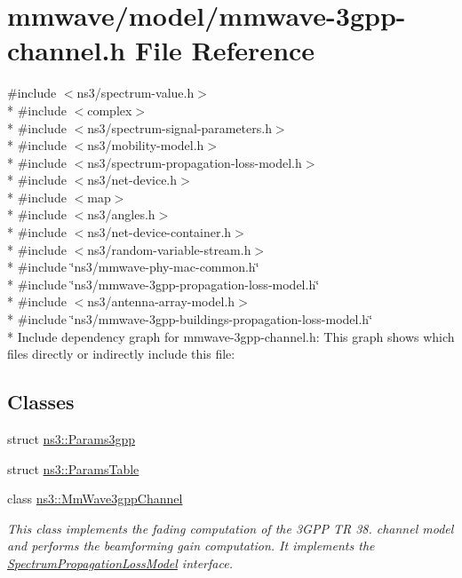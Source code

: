 \hypertarget{mmwave-3gpp-channel_8h}{}\section{mmwave/model/mmwave-\/3gpp-\/channel.h File Reference}
\label{mmwave-3gpp-channel_8h}
{\ttfamily \#include $<$ns3/spectrum-\/value.\+h$>$}\\*
{\ttfamily \#include $<$complex$>$}\\*
{\ttfamily \#include $<$ns3/spectrum-\/signal-\/parameters.\+h$>$}\\*
{\ttfamily \#include $<$ns3/mobility-\/model.\+h$>$}\\*
{\ttfamily \#include $<$ns3/spectrum-\/propagation-\/loss-\/model.\+h$>$}\\*
{\ttfamily \#include $<$ns3/net-\/device.\+h$>$}\\*
{\ttfamily \#include $<$map$>$}\\*
{\ttfamily \#include $<$ns3/angles.\+h$>$}\\*
{\ttfamily \#include $<$ns3/net-\/device-\/container.\+h$>$}\\*
{\ttfamily \#include $<$ns3/random-\/variable-\/stream.\+h$>$}\\*
{\ttfamily \#include \char`\"{}ns3/mmwave-\/phy-\/mac-\/common.\+h\char`\"{}}\\*
{\ttfamily \#include \char`\"{}ns3/mmwave-\/3gpp-\/propagation-\/loss-\/model.\+h\char`\"{}}\\*
{\ttfamily \#include $<$ns3/antenna-\/array-\/model.\+h$>$}\\*
{\ttfamily \#include \char`\"{}ns3/mmwave-\/3gpp-\/buildings-\/propagation-\/loss-\/model.\+h\char`\"{}}\\*
Include dependency graph for mmwave-\/3gpp-\/channel.h\+:
This graph shows which files directly or indirectly include this file\+:
\subsection*{Classes}
\begin{DoxyCompactItemize}
\item 
struct \hyperlink{structns3_1_1Params3gpp}{ns3\+::\+Params3gpp}
\item 
struct \hyperlink{structns3_1_1ParamsTable}{ns3\+::\+Params\+Table}
\item 
class \hyperlink{classns3_1_1MmWave3gppChannel}{ns3\+::\+Mm\+Wave3gpp\+Channel}
\begin{DoxyCompactList}\small\item\em This class implements the fading computation of the 3\+G\+PP TR 38. channel model and performs the beamforming gain computation. It implements the \hyperlink{classns3_1_1SpectrumPropagationLossModel}{Spectrum\+Propagation\+Loss\+Model} interface. \end{DoxyCompactList}\end{DoxyCompactItemize}
